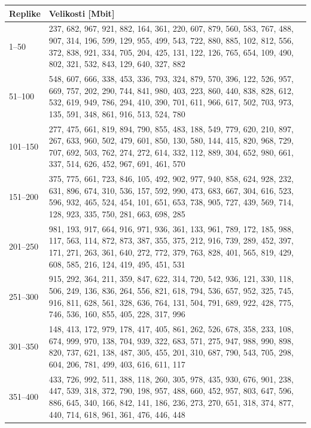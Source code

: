\documentclass[a4paper, 12pt]{book}
\begin{document}
\begin{table}
\tiny
  \begin{center}
    \begin{tabulary}{1.0\textwidth}{p{1.3cm} p{11.58cm}}
      {\scriptsize Replike} & {\scriptsize Velikosti [Mbit]} \\
      --50 & 237, 682, 967, 921, 882, 164, 361, 220, 607, 879, 560, 583, 767, 488, 907, 314, 196, 599, 129, 955, 499, 543, 722, 880, 885, 102, 812, 556, 372, 838, 921, 334, 705, 204, 425, 131, 122, 126, 765, 654, 109, 490, 802, 321, 532, 843, 129, 640, 327, 882 \\
      51--100 & 548, 607, 666, 338, 453, 336, 793, 324, 879, 570, 396, 122, 526, 957, 669, 757, 202, 290, 744, 841, 980, 403, 223, 860, 440, 838, 828, 612, 532, 619, 949, 786, 294, 410, 390, 701, 611, 966, 617, 502, 703, 973, 135, 591, 348, 861, 916, 513, 524, 780 \\
      101--150 & 277, 475, 661, 819, 894, 790, 855, 483, 188, 549, 779, 620, 210, 897, 267, 633, 960, 502, 479, 601, 850, 130, 580, 144, 415, 820, 968, 729, 707, 692, 503, 762, 274, 272, 614, 332, 112, 889, 304, 652, 980, 661, 337, 514, 626, 452, 967, 691, 461, 570 \\
      151--200 & 375, 775, 661, 723, 846, 105, 492, 902, 977, 940, 858, 624, 928, 232, 631, 896, 674, 310, 536, 157, 592, 990, 473, 683, 667, 304, 616, 523, 596, 932, 465, 524, 454, 101, 651, 653, 738, 905, 727, 439, 569, 714, 128, 923, 335, 750, 281, 663, 698, 285 \\
      201--250 & 981, 193, 917, 664, 916, 971, 936, 361, 133, 961, 789, 172, 185, 988, 117, 563, 114, 872, 873, 387, 355, 375, 212, 916, 739, 289, 452, 397, 171, 271, 263, 361, 640, 272, 772, 379, 763, 828, 401, 565, 819, 429, 608, 585, 216, 124, 419, 495, 451, 531 \\
      251--300 & 915, 292, 364, 211, 359, 847, 622, 314, 720, 542, 936, 121, 330, 118, 506, 249, 136, 836, 264, 556, 821, 618, 794, 536, 657, 952, 325, 745, 916, 811, 628, 561, 328, 636, 764, 131, 504, 791, 689, 922, 428, 775, 746, 536, 160, 855, 405, 228, 317, 996 \\
      301--350 & 148, 413, 172, 979, 178, 417, 405, 861, 262, 526, 678, 358, 233, 108, 674, 999, 970, 138, 704, 939, 322, 683, 571, 275, 947, 988, 990, 898, 820, 737, 621, 138, 487, 305, 455, 201, 310, 687, 790, 543, 705, 298, 604, 206, 781, 499, 403, 616, 611, 117 \\
      351--400 & 433, 726, 992, 511, 388, 118, 260, 305, 978, 435, 930, 676, 901, 238, 447, 539, 318, 372, 790, 198, 957, 488, 660, 452, 957, 803, 647, 596, 886, 645, 340, 166, 842, 141, 186, 236, 273, 270, 651, 318, 374, 877, 440, 714, 618, 961, 361, 476, 446, 448 \\

\end{tabulary}
\end{center}
\end{table}
\end{document}
